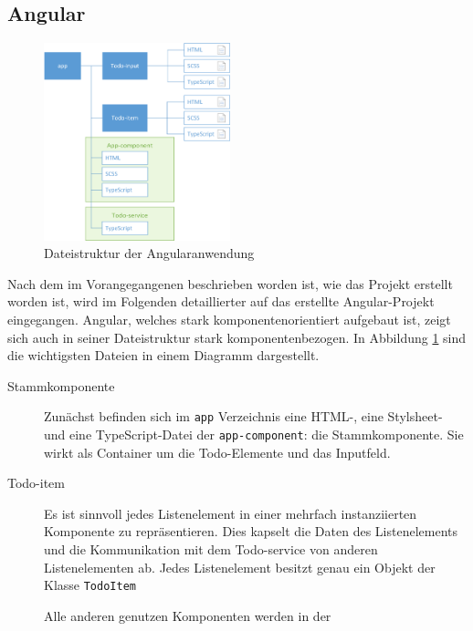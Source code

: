\subsection{Angular}

\begin{figure}
	\includegraphics[width=0.48\textwidth]{img/pwa_dateistruktur.png}
	\centering
	\caption{Dateistruktur der Angularanwendung}
	\label{fig:pwa_dateistruktur}
\end{figure}

Nach dem im Vorangegangenen beschrieben worden ist, wie das Projekt erstellt worden ist, wird im Folgenden detaillierter auf das erstellte Angular-Projekt eingegangen. Angular, welches stark komponentenorientiert aufgebaut ist, zeigt sich auch in seiner Dateistruktur stark komponentenbezogen. In Abbildung \ref{fig:pwa_dateistruktur} sind die wichtigsten Dateien in einem Diagramm dargestellt. 

\begin{description}
	\item[Stammkomponente] Zunächst befinden sich im \texttt{app} Verzeichnis eine HTML-, eine Stylsheet- und eine TypeScript-Datei der \texttt{app-component}: die Stammkomponente. Sie wirkt als Container um die Todo-Elemente und das Inputfeld.
	
	\item[Todo-item] Es ist sinnvoll jedes Listenelement in einer mehrfach instanziierten Komponente zu repräsentieren. Dies kapselt die Daten des Listenelements und die Kommunikation mit dem Todo-service von anderen Listenelementen ab. Jedes Listenelement besitzt genau ein Objekt der Klasse \texttt{TodoItem} 
	
	Alle anderen genutzen Komponenten werden in der
\end{description}

